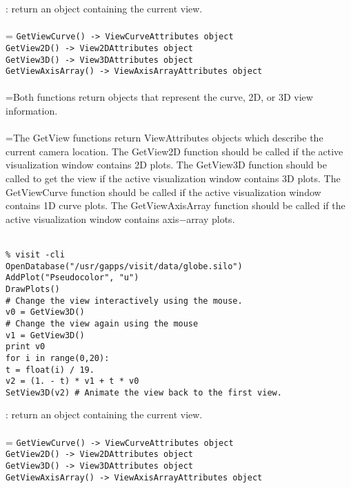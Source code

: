 \documentclass[10pt,a4paper]{report}
\begin{document}
{}
: return an object containing the current view.\\[-3mm]

 \\ 
\hangindent=\parindent 
\verb!GetViewCurve() -> ViewCurveAttributes object!\\ 
\verb!GetView2D() -> View2DAttributes object!\\ 
\verb!GetView3D() -> View3DAttributes object!\\ 
\verb!GetViewAxisArray() -> ViewAxisArrayAttributes object!\\ [-3mm]

 \\ 
\hangindent=\parindent Both functions return objects that represent the curve, 2D, or 3D view information. \\[-3mm] 

 \\ 
\hangindent=\parindent The GetView functions return ViewAttributes objects which describe the current camera location. The GetView2D function should be called if the active visualization window contains 2D plots. The GetView3D function should be called to get the view if the active visualization window contains 3D plots. The GetViewCurve function should be called if the active visualization window contains 1D curve plots.  The GetViewAxisArray function should be called if the active visualization window contains axis$-$array plots. \\[-3mm] 

\\[-6mm]
\begin{verbatim}% visit -cli
OpenDatabase("/usr/gapps/visit/data/globe.silo")
AddPlot("Pseudocolor", "u")
DrawPlots()
# Change the view interactively using the mouse.
v0 = GetView3D()
# Change the view again using the mouse
v1 = GetView3D()
print v0
for i in range(0,20):
t = float(i) / 19.
v2 = (1. - t) * v1 + t * v0
SetView3D(v2) # Animate the view back to the first view.
\end{verbatim}
\newpage


{}
: return an object containing the current view.\\[-3mm]

 \\ 
\hangindent=\parindent 
\verb!GetViewCurve() -> ViewCurveAttributes object!\\ 
\verb!GetView2D() -> View2DAttributes object!\\ 
\verb!GetView3D() -> View3DAttributes object!\\ 
\verb!GetViewAxisArray() -> ViewAxisArrayAttributes object!\\ [-3mm]
\end{document}
